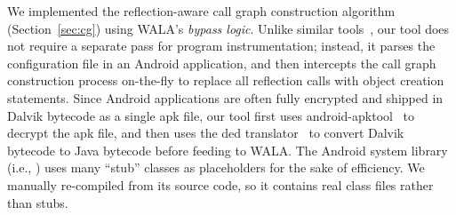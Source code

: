 We implemented the reflection-aware call graph construction
 algorithm (Section~\ref{sec:cg}) using WALA's \textit{bypass logic}.
Unlike similar tools~\cite{Payet:2011:SAA:2032266.2032299}, our tool
does not require a separate
pass for program instrumentation; instead, it
parses the configuration file in an Android application,
and then intercepts the call graph construction
process on-the-fly to replace all reflection calls with object creation statements.
Since Android applications are often fully encrypted and shipped in Dalvik
bytecode as a single apk file, our tool first uses
android-apktool~\cite{apktool} to
decrypt the apk file, and then uses the 
ded translator~\cite{ded} to convert
Dalvik bytecode to Java bytecode before feeding to WALA.  The Android system
library (i.e., ) uses many ``stub'' classes as
placeholders for the sake of efficiency. We manually re-compiled 
 from its source code, so it contains real
class files rather than stubs.
